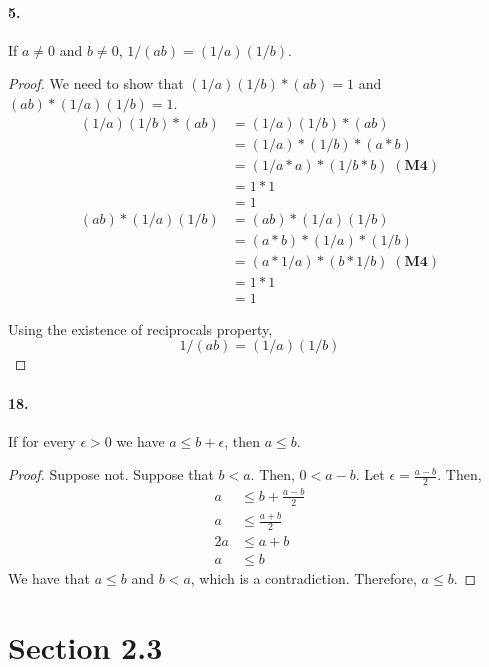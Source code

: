 \documentclass[12pt]{article}
\theoremstyle{remark}
\begin{document}
\paragraph{5.} If $a \neq 0$ and $b \neq 0$, $1 / (ab) = (1 / a)(1 / b)$. 
\begin{proof}
    We need to show that $(1/a)(1/b) * (ab) = 1$ and $(ab) * (1/a)(1/b) = 1$.
    \begin{align*}
        (1/a)(1/b) * (ab) &= (1/a)(1/b) * (ab) \\
        &= (1/a) * (1/b) * (a * b) \\
        &= (1/a * a) * (1/b * b) \mathbf{\;(M4)} \\
        &= 1 * 1 \\
        &= 1
    \end{align*}
    \begin{align*}
        (ab) * (1/a)(1/b) &= (ab) * (1/a)(1/b) \\
        &= (a * b) * (1/a) * (1/b) \\
        &= (a * 1/a) * (b * 1/b) \mathbf{\;(M4)} \\
        &= 1 * 1 \\
        &= 1
    \end{align*}
    
    Using the existence of reciprocals property,
    $$1 / (ab) = (1 / a)(1 / b)$$
\end{proof}

\paragraph{18.} If for every $\epsilon > 0$ we have $a \leq b + \epsilon$, then $a \leq b$.
\begin{proof}
    Suppose not. Suppose that $b < a$. Then, $0 < a - b$. Let $\epsilon = \frac{a - b}{2}$. Then,
    \begin{align*}
        a &\leq b + \frac{a - b}{2} \\
        a &\leq \frac{a + b}{2} \\
        2a &\leq a + b \\
        a &\leq b
    \end{align*}
    We have that $a \leq b$ and $b < a$, which is a contradiction. Therefore, $a \leq b$.
\end{proof}

\section*{Section 2.3}
\end{document}
